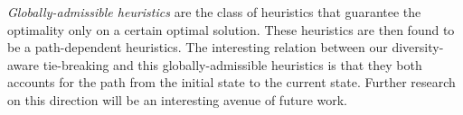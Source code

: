 \emph{Globally-admissible heuristics} \cite{karpas2012optimal} are the class of heuristics that guarantee the optimality only on a certain optimal solution. These heuristics are then found to be a path-dependent heuristics. The interesting relation between our diversity-aware tie-breaking and this globally-admissible heuristics is that they both accounts for the path from the initial state to the current state. Further research on this direction will be an interesting avenue of  future work.
